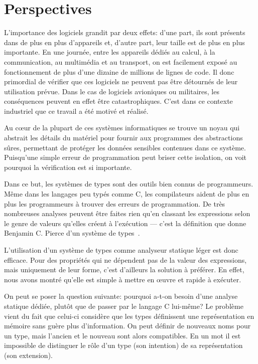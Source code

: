 
\section{Perspectives}

L'importance des logiciels grandit par deux effets: d'une part, ils sont
présents dans de plus en plus d'appareils et, d'autre part, leur taille est de
plus en plus importante. En une journée, entre les appareils dédiés au calcul, à
la communication, au multimédia et au transport, on est facilement exposé au
fonctionnement de plus d'une dizaine de millions de lignes de code. Il donc
primordial de vérifier que ces logiciels ne peuvent pas être détournés de leur
utilisation prévue. Dans le cas de logiciels avioniques ou militaires, les
conséquences peuvent en effet être catastrophiques. C'est dans ce contexte
industriel que ce travail a été motivé et réalisé.

Au cœur de la plupart de ces systèmes informatiques se trouve un noyau qui
abstrait les détails du matériel pour fournir aux programmes des abstractions
sûres, permettant de protéger les données sensibles contenues dans ce système.
Puisqu'une simple erreur de programmation peut briser cette isolation, on voit
pourquoi la vérification est si importante.

Dans ce but, les systèmes de types sont des outils bien connus de programmeurs.
Même dans les langages peu typés comme C, les compilateurs aident de plus en
plus les programmeurs à trouver des erreurs de programmation. De très nombreuses
analyses peuvent être faites rien qu'en classant les expressions selon le genre
de valeurs qu'elles créent à l'exécution --- c'est la définition que donne
Benjamin C. Pierce d'un système de types~\cite{TAPL}.

L'utilisation d'un système de types comme analyseur statique léger est donc
efficace. Pour des propriétés qui ne dépendent pas de la valeur des expressions,
mais uniquement de leur forme, c'est d'ailleurs la solution à préférer. En
effet, nous avons montré qu'elle est simple à mettre en œuvre et rapide à
exécuter.

On peut se poser la question suivante: pourquoi a-t-on besoin d'une analyse
statique dédiée, plutôt que de passer par le langage C lui-même? Le problème
vient du fait que celui-ci considère que les types définissent une
représentation en mémoire sans guère plus d'information. On peut définir de
nouveaux noms pour un type, mais l'ancien et le nouveau sont alors compatibles.
En un mot il est impossible de distinguer le rôle d'un type (son intention) de
sa représentation (son extension).

